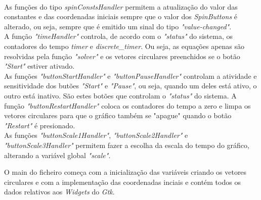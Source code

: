 \documentclass[11pt]{article}
\begin{document}
{\\
\indent
As fun\c{c}\~oes do tipo \textit{spinConstsHandler} permitem a atualiza\c{c}\~ao do valor das constantes e das coordenadas iniciais sempre que o valor dos \textit{SpinButtons} \'e alterado, ou seja, sempre que \'e emitido um sinal do tipo \textit{"value-changed"}.
\\
\indent
A fun\c{c}\~ao \textit{"timeHandler"} controla, de acordo com o \textit{"status"} do sistema, os contadores do tempo \textit{timer} e \textit{discrete\_timer}. Ou seja, as equa\c{c}\~oes apenas s\~ao resolvidas pela fun\c{c}\~ao \textit{"solver"} e os vetores circulares preenchidos se o bot\~ao \textit{"Start"} estiver ativado. 
\\
\indent
As fun\c{c}\~oes \textit{"buttonStartHandler"} e \textit{"buttonPauseHandler"} controlam a atividade e sensitividade dos but\~oes \textit{"Start"} e \textit{"Pause"}, ou seja, quando um deles est\'a ativo, o outro est\'a inativo. S\~ao estes bot\~oes que controlam o \textit{"status"} do sistema. A fun\c{c}\~ao \textit{"buttonRestartHandler"} coloca os contadores do tempo a zero e limpa os vetores circulares para que o gr\'afico tamb\'em se "apague" quando o bot\~ao \textit{"Restart"} \'e presionado.
\\
\indent
As fun\c{c}\~oes \textit{"buttonScale1Handler"}, \textit{"buttonScale2Handler"} e \textit{"buttonScale3Handler"} permitem fazer a escolha da escala do tempo do gr\'afico, alterando a vari\'avel global \textit{"scale"}.

O main do ficheiro come\c{c}a com a inicializa\c{c}\~ao das vari\'aveis criando os vetores circulares e com a implementa\c{c}\~ao das coordenadas inciais e cont\'em todos os dados relativos aos \textit{Widgets} do \textit{Gtk}.
}
\end{document}
